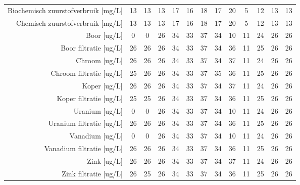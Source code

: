 \begin{tabular}{ r |c | c | c | c | c |c | c | c | c | c | c | c }
Biochemisch zuurstofverbruik [mg/L] &13 & 13 & 13 & 17 & 16 & 18 & 17 & 20 & 5 & 12 & 13 & 13 \\
Chemisch zuurstofverbruik [mg/L] &13 & 13 & 13 & 17 & 16 & 18 & 17 & 20 & 5 & 12 & 13 & 13 \\
Boor [ug/L] &0 & 0 & 26 & 34 & 33 & 37 & 34 & 10 & 11 & 24 & 26 & 26 \\
Boor filtratie [ug/L] &26 & 26 & 26 & 34 & 33 & 37 & 34 & 36 & 11 & 25 & 26 & 26 \\
Chroom [ug/L] &26 & 26 & 26 & 34 & 33 & 37 & 34 & 37 & 11 & 24 & 26 & 26 \\
Chroom filtratie [ug/L] &25 & 26 & 26 & 34 & 33 & 37 & 35 & 36 & 11 & 25 & 26 & 26 \\
Koper [ug/L] &26 & 26 & 26 & 34 & 33 & 37 & 34 & 37 & 11 & 24 & 26 & 26 \\
Koper filtratie [ug/L] &25 & 25 & 26 & 34 & 33 & 37 & 34 & 36 & 11 & 25 & 26 & 26 \\
Uranium [ug/L] &0 & 0 & 26 & 34 & 33 & 37 & 34 & 10 & 11 & 24 & 26 & 26 \\
Uranium filtratie [ug/L] &26 & 26 & 26 & 34 & 33 & 37 & 34 & 36 & 11 & 25 & 26 & 26 \\
Vanadium [ug/L] &0 & 0 & 26 & 34 & 33 & 37 & 34 & 10 & 11 & 24 & 26 & 26 \\
Vanadium filtratie [ug/L] &26 & 26 & 26 & 34 & 33 & 37 & 34 & 36 & 11 & 25 & 26 & 26 \\
Zink [ug/L] &26 & 26 & 26 & 34 & 33 & 37 & 34 & 37 & 11 & 24 & 26 & 26 \\
Zink filtratie [ug/L] &26 & 25 & 26 & 34 & 33 & 37 & 34 & 36 & 11 & 25 & 26 & 26 \\
\end{tabular}    
